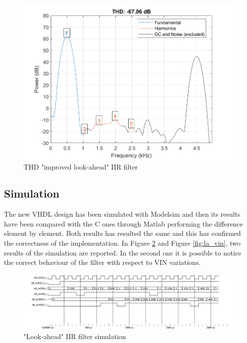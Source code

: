 \documentclass[a4paper, titlepage]{article}
\begin{document}
 \begin{figure} [h]
\centering
	\includegraphics[scale=0.6]{thd_vhdl_la.png}
	\caption{THD "improved look-ahead" IIR filter}
	\label{fig:thd_vhdl_la}
\end{figure}
\newpage
\subsection{Simulation}
The new VHDL design has been simulated with Modelsim and then its results have been compared with the C ones through Matlab performing the difference element by element. Both results has resulted the same and this has confirmed the correctness of the implementation. In Figure \ref{fig:la_start} and Figure \ref{fig:la_vin}, two results of the simulation are reported. In the second one it is possible to notice the correct behaviour of the filter with respect to VIN variations.

 \begin{figure} [h]
\centering
	\includegraphics[scale=0.55]{la_vin.png}
	\caption{"Look-ahead" IIR filter simulation}
	\label{fig:la_start}
\end{figure}
\end{document}
